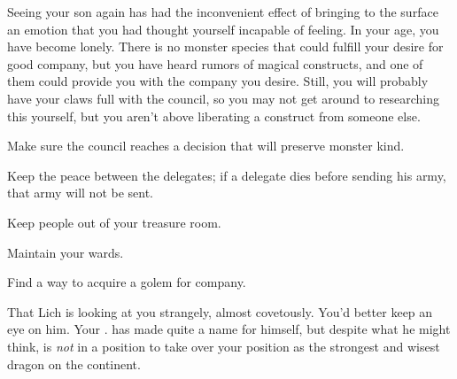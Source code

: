 \documentclass[char]{guildcamp2}
\begin{document}
Seeing your son again has had the inconvenient effect of bringing to the surface an emotion that you had thought yourself incapable of feeling. In your age, you have become lonely. There is no monster species that could fulfill your desire for good company, but you have heard rumors of magical constructs, and one of them could provide you with the company you desire. Still, you will probably have your claws full with the council, so you may not get around to researching this yourself, but you aren't above liberating a construct from someone else.
	
	
	
	\begin{itemz}[Goals]
  \item Make sure the council reaches a decision that will preserve monster kind.
	\item Keep the peace between the delegates; if a delegate dies before sending  his army, that army will not be sent.
	\item Keep people out of your treasure room.
	\item Maintain your wards.
		\item Find a way to acquire a golem for company.
\end{itemz}

\begin{contacts}
  \contact{\cLich{}} That Lich is looking at you strangely, almost covetously. You'd better keep an eye on him.
	\contact{\cRed{}} Your \cRed{\offspring}. \cRed{\They} has made quite a name for himself, but despite what he might think, is \emph{not} in a position to take over your position as the strongest and wisest dragon on the continent.
\end{contacts}
\end{document}
